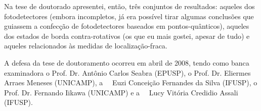 Na tese de doutorado apresentei, então, três conjuntos de resultados: aqueles dos fotodetectores (embora incompletos, já era possível tirar algumas conclusões que guiassem a confecção de fotodetectores baseados em pontos-quânticos), aqueles dos estados de borda contra-rotativos (os que eu mais gostei, apesar de tudo) e aqueles relacionados às medidas de localização-fraca.

A defesa da tese de doutoramento ocorreu em abril de 2008, tendo como banca examinadora o Prof. Dr. Antônio Carlos Seabra (EPUSP), o Prof. Dr. Eliermes Arraes Meneses (UNICAMP), a \profa\ \dra\ Euzi Conceição Fernandes da Silva (IFUSP), o Prof. Dr. Fernando Iikawa (UNICAMP) e a \profa\ \dra\ Lucy Vitória Credidio Assali (IFUSP).
